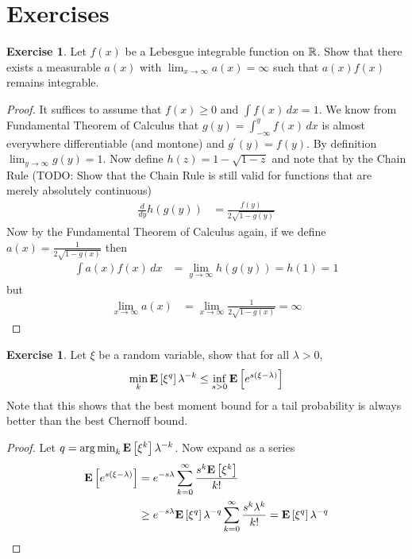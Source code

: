 \documentclass{amsart}
\DeclareMathOperator*{\argmin}{arg\,min}
\theoremstyle{remark}
\theoremstyle{definition}
\newtheorem{ex}[thm]{Exercise}
\begin{document}










\section{Exercises}
\begin{ex}Let $f(x)$ be a Lebesgue integrable function on $\mathbb{R}$.
  Show that there exists a measurable $a(x)$ with $\lim_{x \to \infty}
  a(x) = \infty$ such that $a(x)f(x)$ remains integrable.
\end{ex}
\begin{proof}
It suffices to assume that $f(x) \geq 0$ and $\int f(x) \, dx = 1$.
We know from Fundamental Theorem of Calculus that $g(y) = \int_{-\infty}^y
f(x) \, dx$ is almost everywhere differentiable (and montone) and
$g^\prime(y) = f(y)$.   By
definition $\lim_{y \to \infty} g(y) = 1$.  Now define $h(z) = 1 -
\sqrt{1 -z}$ and note that by the Chain Rule (TODO: Show that the
Chain Rule is still valid for functions that are merely absolutely continuous)
\begin{align*}
\frac{d}{dy} h(g(y)) &= \frac{f(y)}{2 \sqrt{1 - g(y)}}
\end{align*}
Now by the Fundamental Theorem of Calculus again, if we define $a(x) =
\frac{1}{2 \sqrt{1 - g(x)}}$ 
then 
\begin{align*}
\int a(x) f(x) \, dx &= \lim_{y \to \infty} h(g(y)) = h(1) = 1
\end{align*}
but 
\begin{align*}
\lim_{x \to \infty} a(x) &= \lim_{x \to \infty} \frac{1}{2 \sqrt{1 -
    g(x)}} = \infty
\end{align*}
\end{proof}
\begin{ex}Let $\xi$ be a random variable, show that for all $\lambda > 0$,
\begin{align*}
\min_k \textbf{E}\left[\xi^q\right] \lambda^{-k} \leq \inf_{s>0} \textbf{E}\left[e^{s(\xi-\lambda)}\right]
\end{align*}
Note that this shows that the best moment bound for a tail
probability is always better than the best Chernoff bound.
\end{ex}
\begin{proof}
Let $q = \argmin_k \expectation{\xi^k} \lambda^{-k}$.  Now expand as a
series
\begin{align*}
\textbf{E}\left[e^{s(\xi-\lambda)}\right] &= e^{-s\lambda} \sum_{k=0}^\infty
\frac{s^k \textbf{E}\left[\xi^k\right]}{k!} \\
& \geq e^{-s\lambda} \textbf{E}\left[\xi^q\right] \lambda^{-q} \sum_{k=0}^\infty
\frac{s^k \lambda^k}{k!} = \textbf{E}\left[\xi^q\right] \lambda^{-q}
\end{align*}
\end{proof}
\end{document}
